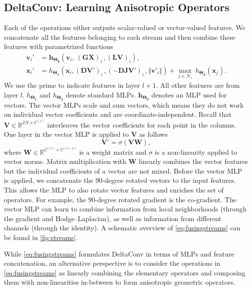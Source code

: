 \documentclass[acmtog, authorversion]{acmart}
\begin{document}
\subsection{DeltaConv: Learning Anisotropic Operators}
Each of the operations either outputs scalar-valued or vector-valued features. We concatenate all the features belonging to each stream and then combine these features with parametrized functions
\begin{align}
    \mathbf{v}_i' &= \mathbf{h}_{\mathbf{\Theta_0}}(\mathbf{v}_i, \,  (\mathbf{GX})_i\, ,  (\mathbf{LV})_i), \nonumber \\
    \mathbf{x}_i' &= h_{\mathbf{\Theta_1}}(\mathbf{x}_i, (\mathbf{DV'})_i\, , (-\mathbf{DJV'})_i\, , \Vert \mathbf{v'}_i\Vert) + \max_{j \in \mathcal{N}_i}\,h_{\mathbf{\Theta_2}}(\mathbf{x}_j). 
    \label{eq:fusingstreams}
\end{align}
We use the prime to indicate features in layer $l+1$. All other features are from layer $l$. $h_{\mathbf{\Theta_1}}$ and $h_{\mathbf{\Theta_2}}$ denote standard MLPs. $\mathbf{h}_{\mathbf{\Theta_0}}$ denotes an MLP used for vectors.
The vector MLPs scale and sum vectors, which means they do not work on individual vector coefficients and are coordinate-independent. Recall that $\mathbf{V} \in \mathbb{R}^{2N \times C^{(l)}}$ interleaves the vector coefficients for each point in the columns. One layer in the vector MLP is applied to $\mathbf{V}$ as follows
\begin{equation}
    \mathbf{V}' = \sigma(\mathbf{VW}),
\end{equation}
where $\mathbf{W} \in \mathbb{R}^{C^{(l)} \times C^{(l+1)}}$ is a weight matrix and $\sigma$ is a non-linearity applied to vector norms.
Matrix multiplication with $\mathbf{W}$ linearly combines the vector features but the individual coefficients of a vector are not mixed. Before the vector MLP is applied, we concatenate the 90-degree rotated vectors to the input features. This allows the MLP to also rotate vector features and enriches the set of operators. For example, the 90-degree rotated gradient is the co-gradient. The vector MLP can learn to combine information from local neighborhoods (through the gradient and Hodge--Laplacian), as well as information from different channels (through the identity). A schematic overview of \autoref{eq:fusingstreams} can be found in \autoref{fig:streams}.

While \autoref{eq:fusingstreams} formulates DeltaConv in terms of MLPs and feature concatenation, an alternative perspective is to consider the operations in \autoref{eq:fusingstreams} as linearly combining the elementary operators and composing them with non-linearities in-between to form anisotropic geometric operators.
\end{document}
